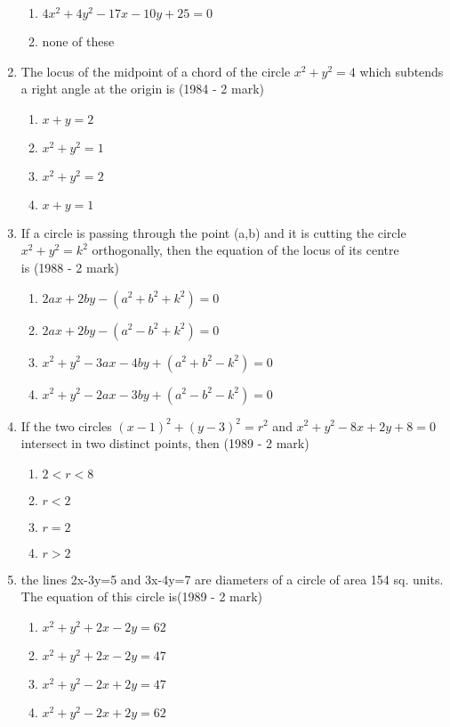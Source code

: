 \documentclass[journal,12pt,twocolumn]{IEEEtran}
\theoremstyle{remark}
\begin{document}
\begin{enumerate}
\begin{enumerate}
    \item $4x^{2}+4y^{2}-17x-10y+25=0$
    \item none of these
    \end{enumerate}
    \item The locus of the midpoint of a chord of the circle $x^{2}+y^{2}=4$ which subtends a right angle at the origin is \hfill {(1984 - 2 mark)}
    \begin{enumerate}
    \item $x+y=2$
    \item $x^{2}+y^{2}=1$
    \item $x^{2}+y^{2}=2$
    \item $x+y=1$
    \end{enumerate}
    \item If a circle is passing through the point (a,b) and it is cutting the circle $x^{2}+y^{2}=k^{2}$ orthogonally, then the equation of the locus of its centre \\ is 
    \hfill {(1988 - 2 mark)}
    \begin{enumerate}
    \item $2ax + 2by - (a^{2}+b^{2}+k^{2}) = 0$
    \item $2ax + 2by - (a^{2}-b^{2}+k^{2}) = 0$
    \item $x^{2} + y^{2}-3ax-4by+ (a^{2}+b^{2}-k^{2}) = 0$
    \item $x^{2} + y^{2}-2ax-3by+ (a^{2}-b^{2}-k^{2}) = 0$
    \end{enumerate}
    \item If the two circles $(x-1)^{2} + (y-3)^{2} = r^{2}$ and $x^{2}+y^{2}-8x+2y+8=0$ intersect in two distinct points, then \hfill {(1989 - 2 mark)} 
    \begin{enumerate}
    \item $2<r<8$
    \item $r<2$
    \item $r=2$
    \item $r>2$
    \end{enumerate}
    \item the lines 2x-3y=5 and 3x-4y=7 are diameters of a circle of area 154 sq. units. The equation of this circle is\hfill {(1989 - 2 mark)}
    \begin{enumerate}
    \item $x^{2}+y^{2}+2x-2y=62$
    \item $x^{2}+y^{2}+2x-2y=47$
    \item $x^{2}+y^{2}-2x+2y=47$
    \item $x^{2}+y^{2}-2x+2y=62$

\end{enumerate}
\end{enumerate}
\end{document}
